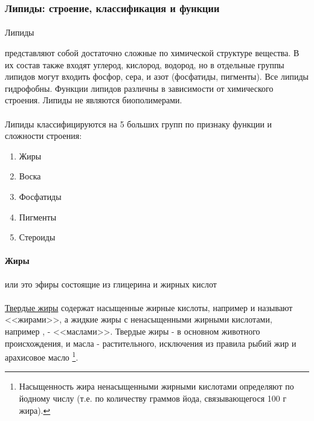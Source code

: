 
\subsubsection*{Липиды: строение, классификация и функции}

\paragraph*{}\hypertarget{sect_lipids}{Липиды} представляют собой достаточно сложные по химической структуре вещества. В их состав также входят углерод, кислород, водород, но в отдельные группы липидов могут входить фосфор, сера, и азот (фосфатиды, пигменты). Все липиды гидрофобны. Функции липидов различны в зависимости от химического строения. Липиды не являются биополимерами.


\paragraph*{}Липиды классифицируются на 5 больших групп по признаку функции и сложности строения:

\begin{enumerate}

	\item Жиры
	\item Воска
	\item Фосфатиды
	\item Пигменты
	\item Стероиды
	
\end{enumerate}

\paragraph*{Жиры} или это эфиры состоящие из глицерина и жирных кислот

\paragraph*{}\hyperlink{question_lipid}{Твердые жиры} содержат насыщенные жирные кислоты, например  и  называют <<жирами>>, а жидкие жиры с ненасыщенными жирными кислотами, например ,  - <<маслами>>. Твердые жиры - в основном животного происхождения, и масла - растительного, исключения из правила рыбий жир и арахисовое масло \footnote{Насыщенность жира ненасыщенными жирными кислотами определяют по йодному числу (т.е. по количеству граммов йода, связывающегося 100 г жира).}. 

